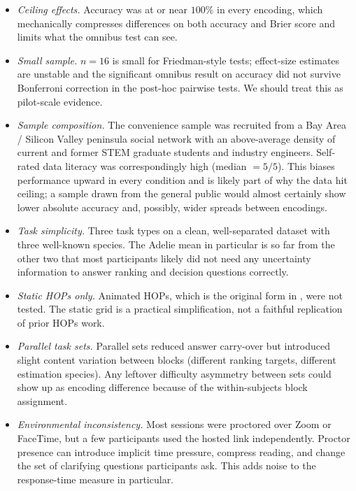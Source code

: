 \documentclass{article}
\begin{document}
\begin{itemize}[leftmargin=*, itemsep=4pt]
\item \emph{Ceiling effects.}  Accuracy was at or near $100\%$ in
  every encoding, which mechanically compresses differences on both
  accuracy and Brier score and limits what the omnibus test can see.
\item \emph{Small sample.}  $n = 16$ is small for Friedman-style
  tests; effect-size estimates are unstable and the significant
  omnibus result on accuracy did not survive Bonferroni correction in
  the post-hoc pairwise tests.  We should treat this as pilot-scale
  evidence.
\item \emph{Sample composition.}  The convenience sample was
  recruited from a Bay Area / Silicon Valley peninsula social network
  with an above-average density of current and former STEM graduate
  students and industry engineers.  Self-rated data literacy was
  correspondingly high (median $= 5/5$).  This biases performance
  upward in every condition and is likely part of why the data hit
  ceiling; a sample drawn from the general public would almost
  certainly show lower absolute accuracy and, possibly, wider spreads
  between encodings.
\item \emph{Task simplicity.}  Three task types on a clean,
  well-separated dataset with three well-known species.  The Adelie
  mean in particular is so far from the other two that most
  participants likely did not need any uncertainty information to
  answer ranking and decision questions correctly.
\item \emph{Static HOPs only.}  Animated HOPs, which is the original
  form in \cite{hullman2015}, were not tested.  The static grid is a
  practical simplification, not a faithful replication of prior
  HOPs work.
\item \emph{Parallel task sets.}  Parallel sets reduced answer
  carry-over but introduced slight content variation between blocks
  (different ranking targets, different estimation species).  Any
  leftover difficulty asymmetry between sets could show up as
  encoding difference because of the within-subjects block
  assignment.
\item \emph{Environmental inconsistency.}  Most sessions were
  proctored over Zoom or FaceTime, but a few participants used the
  hosted link independently.  Proctor presence can introduce
  implicit time pressure, compress reading, and change the set of
  clarifying questions participants ask.  This adds noise to the
  response-time measure in particular.
\end{itemize}
\end{document}
